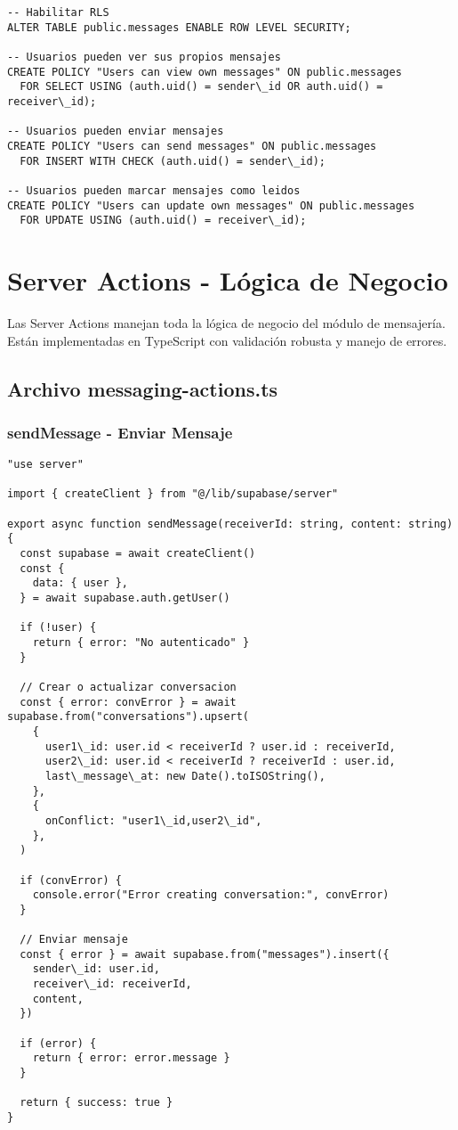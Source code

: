 \documentclass[12pt,a4paper]{article}
\begin{document}
\begin{lstlisting}[caption=Políticas RLS para messages]
-- Habilitar RLS
ALTER TABLE public.messages ENABLE ROW LEVEL SECURITY;

-- Usuarios pueden ver sus propios mensajes
CREATE POLICY "Users can view own messages" ON public.messages
  FOR SELECT USING (auth.uid() = sender\_id OR auth.uid() = receiver\_id);

-- Usuarios pueden enviar mensajes
CREATE POLICY "Users can send messages" ON public.messages
  FOR INSERT WITH CHECK (auth.uid() = sender\_id);

-- Usuarios pueden marcar mensajes como leidos
CREATE POLICY "Users can update own messages" ON public.messages
  FOR UPDATE USING (auth.uid() = receiver\_id);
\end{lstlisting}

\section{Server Actions - Lógica de Negocio}

Las Server Actions manejan toda la lógica de negocio del módulo de mensajería. Están implementadas en TypeScript con validación robusta y manejo de errores.

\subsection{Archivo messaging-actions.ts}

\subsubsection{sendMessage - Enviar Mensaje}

\begin{lstlisting}[caption=Función sendMessage completa]
"use server"

import { createClient } from "@/lib/supabase/server"

export async function sendMessage(receiverId: string, content: string) {
  const supabase = await createClient()
  const {
    data: { user },
  } = await supabase.auth.getUser()

  if (!user) {
    return { error: "No autenticado" }
  }

  // Crear o actualizar conversacion
  const { error: convError } = await supabase.from("conversations").upsert(
    {
      user1\_id: user.id < receiverId ? user.id : receiverId,
      user2\_id: user.id < receiverId ? receiverId : user.id,
      last\_message\_at: new Date().toISOString(),
    },
    {
      onConflict: "user1\_id,user2\_id",
    },
  )

  if (convError) {
    console.error("Error creating conversation:", convError)
  }

  // Enviar mensaje
  const { error } = await supabase.from("messages").insert({
    sender\_id: user.id,
    receiver\_id: receiverId,
    content,
  })

  if (error) {
    return { error: error.message }
  }

  return { success: true }
}
\end{lstlisting}
\end{document}
